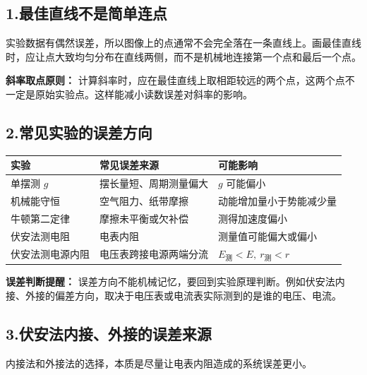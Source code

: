 \subsection*{1.\quad 最佳直线不是简单连点}

实验数据有偶然误差，所以图像上的点通常不会完全落在一条直线上。画最佳直线时，应让点大致均匀分布在直线两侧，而不是机械地连接第一个点和最后一个点。

\begin{center}


\label{fig:experiment-linear-fit}
\end{center}

\textbf{斜率取点原则：} 计算斜率时，应在最佳直线上取相距较远的两个点，这两个点不一定是原始实验点。这样能减小读数误差对斜率的影响。

\subsection*{2.\quad 常见实验的误差方向}

\begin{center}
\begin{tabular}{lll}
\toprule
实验 & 常见误差来源 & 可能影响 \\
\midrule
单摆测 $g$ & 摆长量短、周期测量偏大 & $g$ 可能偏小 \\
机械能守恒 & 空气阻力、纸带摩擦 & 动能增加量小于势能减少量 \\
牛顿第二定律 & 摩擦未平衡或欠补偿 & 测得加速度偏小 \\
伏安法测电阻 & 电表内阻 & 测量值可能偏大或偏小 \\
伏安法测电源内阻 & 电压表跨接电源两端分流 & $E_{\text{测}}<E,\ r_{\text{测}}<r$ \\
\bottomrule
\end{tabular}
\end{center}

\textbf{误差判断提醒：} 误差方向不能机械记忆，要回到实验原理判断。例如伏安法内接、外接的偏差方向，取决于电压表或电流表实际测到的是谁的电压、电流。

\subsection*{3.\quad 伏安法内接、外接的误差来源}

内接法和外接法的选择，本质是尽量让电表内阻造成的系统误差更小。

\begin{center}


\label{fig:voltmeter-ammeter-error}
\end{center}

